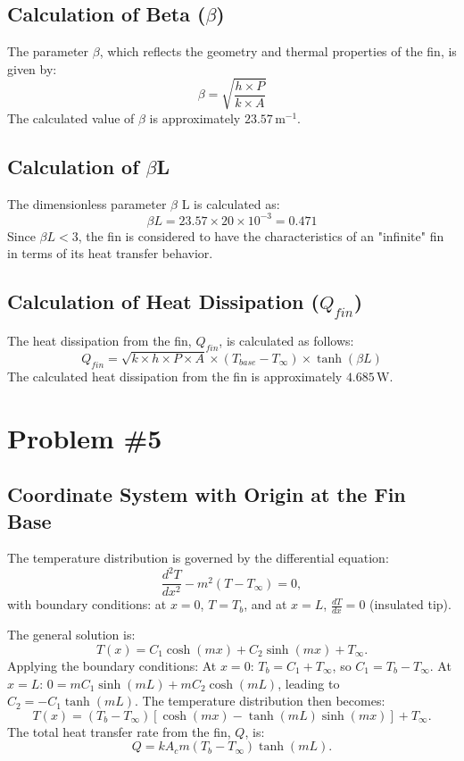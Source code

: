 \documentclass{article}
\begin{document}
\subsection*{Calculation of Beta ($\beta$)}
The parameter $\beta$, which reflects the geometry and thermal properties of the fin, is given by:
\begin{equation}
    \beta = \sqrt{\frac{h \times P}{k \times A}}
\end{equation}
The calculated value of $\beta$ is approximately $23.57 \, \text{m}^{-1}$.

\subsection*{Calculation of $\beta$L}
The dimensionless parameter $\beta$ L is calculated as:
\begin{equation}
    \beta L = 23.57 \times 20 \times 10^{-3} = 0.471
\end{equation}
Since $\beta L < 3$, the fin is considered to have the characteristics of an "infinite" fin in terms of its heat transfer behavior.

\subsection*{Calculation of Heat Dissipation (\(Q_{fin}\))}
The heat dissipation from the fin, $Q_{fin}$, is calculated as follows:
\begin{equation}
    Q_{fin} = \sqrt{k \times h \times P \times A} \times (T_{base} - T_{\infty}) \times \tanh(\beta L)
\end{equation}
The calculated heat dissipation from the fin is approximately $4.685 \, \text{W}$.


\newpage
\section*{Problem \#5}
\subsection*{Coordinate System with Origin at the Fin Base}
The temperature distribution is governed by the differential equation:
\[
\frac{d^2T}{dx^2} - m^2(T - T_\infty) = 0,
\]
with boundary conditions: at $x = 0$, $T = T_b$, and at $x = L$, $\frac{dT}{dx} = 0$ (insulated tip).

The general solution is:
\[
T(x) = C_1 \cosh(mx) + C_2 \sinh(mx) + T_\infty.
\]
Applying the boundary conditions:
At $x = 0$: $T_b = C_1 + T_\infty$, so $C_1 = T_b - T_\infty$.
At $x = L$: $0 = mC_1 \sinh(mL) + mC_2 \cosh(mL)$, leading to $C_2 = -C_1 \tanh(mL)$.
The temperature distribution then becomes:
\[
T(x) = (T_b - T_\infty) \left[\cosh(mx) - \tanh(mL) \sinh(mx)\right] + T_\infty.
\]
The total heat transfer rate from the fin, $Q$, is:
\[
Q = kA_c m (T_b - T_\infty) \tanh(mL).
\]
\end{document}
